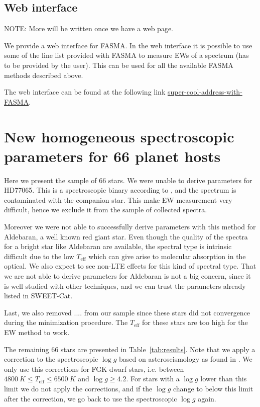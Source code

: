 \documentclass{aa}
\begin{document}
\subsection{Web interface}
\label{sub:Web interface}
NOTE: More will be written once we have a web page.

We provide a web interface for FASMA. In the web interface it is possible to use
some of the line list provided with FASMA to measure EWs of a spectrum (has to
be provided by the user). This can be used for all the available FASMA methods
described above.

The web interface can be found at the following link
\url{super-cool-address-with-FASMA}.



\section{New homogeneous spectroscopic parameters for 66 planet hosts}
\label{sec:results}
Here we present the sample of 66 stars. We were unable to derive parameters for
HD77065. This is a spectroscopic binary according to \cite{Pourbaix2004}, and
the spectrum is contaminated with the companion star. This make EW measurement
very difficult, hence we exclude it from the sample of collected spectra.

Moreover we were not able to successfully derive parameters with this method for
Aldebaran, a well known red giant star. Even though the quality of the spectra
for a bright star like Aldebaran are available, the spectral type is intrinsic
difficult due to the low $T_\mathrm{eff}$ which can give arise to molecular
absorption in the optical. We also expect to see non-LTE effects for this kind
of spectral type. That we are not able to derive parameters for Aldebaran is not
a big concern, since it is well studied with other techniques, and we can trust
the parameters already listed in SWEET-Cat.

Last, we also removed .... from our sample since these stars did not convergence
during the minimization procedure. The $T_\mathrm{eff}$ for these stars are too
high for the EW method to work.

The remaining 66 stars are presented in Table~\ref{tab:results}. Note that we
apply a correction to the spectroscopic $\log g$ based on asteroseismology as
found in \citet{Mortier2014}. We only use this corrections for FGK dwarf stars,
i.e. between $\SI{4800}{K}\leq T_\mathrm{eff} \leq \SI{6500}{K}$ and
$\log g\geq4.2$. For stars with a $\log g$ lower than this limit we do not apply
the corrections, and if the $\log g$ change to below this limit after the
correction, we go back to use the spectroscopic $\log g$ again.
\end{document}
